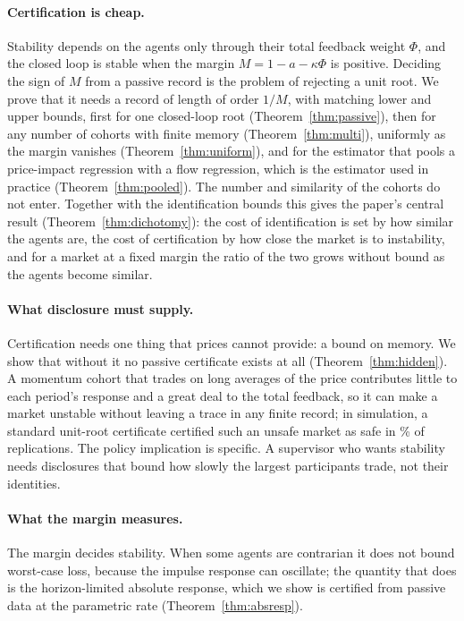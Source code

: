 \documentclass[12pt]{article}
\theoremstyle{definition}
\theoremstyle{remark}
\begin{document}
\paragraph{Certification is cheap.} Stability depends on the agents only through their total feedback weight $\Phi$, and the closed loop is stable when the margin $M=1-a-\kappa\Phi$ is positive. Deciding the sign of $M$ from a passive record is the problem of rejecting a unit root. We prove that it needs a record of length of order $1/M$, with matching lower and upper bounds, first for one closed-loop root (Theorem~\ref{thm:passive}), then for any number of cohorts with finite memory (Theorem~\ref{thm:multi}), uniformly as the margin vanishes (Theorem~\ref{thm:uniform}), and for the estimator that pools a price-impact regression with a flow regression, which is the estimator used in practice (Theorem~\ref{thm:pooled}). The number and similarity of the cohorts do not enter. Together with the identification bounds this gives the paper's central result (Theorem~\ref{thm:dichotomy}): the cost of identification is set by how similar the agents are, the cost of certification by how close the market is to instability, and for a market at a fixed margin the ratio of the two grows without bound as the agents become similar.

\paragraph{What disclosure must supply.} Certification needs one thing that prices cannot provide: a bound on memory. We show that without it no passive certificate exists at all (Theorem~\ref{thm:hidden}). A momentum cohort that trades on long averages of the price contributes little to each period's response and a great deal to the total feedback, so it can make a market unstable without leaving a trace in any finite record; in simulation, a standard unit-root certificate certified such an unsafe market as safe in \UniformUnsafeRate\% of replications. The policy implication is specific. A supervisor who wants stability needs disclosures that bound how slowly the largest participants trade, not their identities.

\paragraph{What the margin measures.} The margin decides stability. When some agents are contrarian it does not bound worst-case loss, because the impulse response can oscillate; the quantity that does is the horizon-limited absolute response, which we show is certified from passive data at the parametric rate (Theorem~\ref{thm:absresp}).
\end{document}
